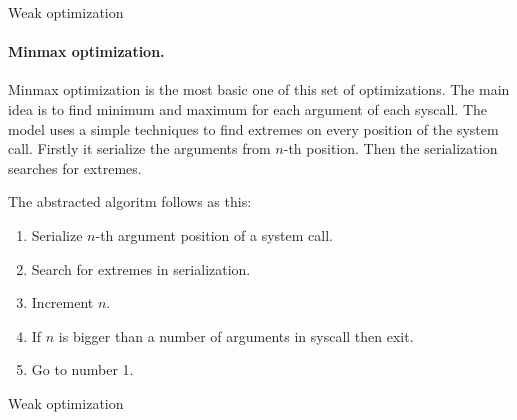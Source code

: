 	\begin{algorithm}[H]



		\caption{Weak optimization}\label{algo:weak}
	\end{algorithm}

	\paragraph{Minmax optimization.}
	Minmax optimization is the most basic one of this set of optimizations.
	The main idea is to find minimum and maximum for each argument of each syscall.
	The model uses a simple  techniques to find extremes on every position of the system call.
	Firstly it serialize the arguments from $n$-th position. Then the serialization
	searches for extremes.

	The abstracted algoritm follows as this:
	\begin{enumerate}
		\item Serialize $n$-th argument position of a system call.
		\item Search for extremes in serialization.
		\item Increment $n$.
		\item If $n$ is bigger than a number of arguments in syscall then exit.
		\item Go to number 1.
	\end{enumerate}

	\begin{algorithm}[H]



		\caption{Weak optimization}\label{algo:weak}
	\end{algorithm}


